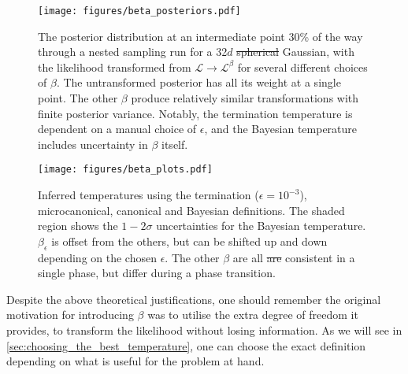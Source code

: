 \documentclass[usenatbib]{mnras}
\newcommand{\Like}{\mathcal{L}}
\providecommand{\DIFaddtex}[1]{{\protect\color{blue}\uwave{#1}}} %
\providecommand{\DIFdeltex}[1]{{\protect\color{red}\sout{#1}}}                      %
\providecommand{\DIFaddFL}[1]{\DIFadd{#1}} %
\providecommand{\DIFdelFL}[1]{\DIFdel{#1}} %
\providecommand{\DIFaddbeginFL}{} %
\providecommand{\DIFaddendFL}{} %
\providecommand{\DIFdelbeginFL}{} %
\providecommand{\DIFdelendFL}{} %
\providecommand{\DIFadd}[1]{\texorpdfstring{\DIFaddtex{#1}}{#1}} %
\providecommand{\DIFdel}[1]{\texorpdfstring{\DIFdeltex{#1}}{}} %
\newcommand{\DIFscaledelfig}{0.5}
\newlength{\DIFdelgraphicswidth} %
\newlength{\DIFdelgraphicsheight} %
\newcommand{\DIFaddincludegraphics}[2][]{{\color{blue}\fbox{\DIFOincludegraphics[#1]{#2}}}} %
\newcommand{\DIFdelincludegraphics}[2][]{%
\sbox{\DIFdelgraphicsbox}{\DIFOincludegraphics[#1]{#2}}%
\settoboxwidth{\DIFdelgraphicswidth}{\DIFdelgraphicsbox} %
\settoboxtotalheight{\DIFdelgraphicsheight}{\DIFdelgraphicsbox} %
\scalebox{\DIFscaledelfig}{%
\parbox[b]{\DIFdelgraphicswidth}{\usebox{\DIFdelgraphicsbox}\\[-\baselineskip] \rule{\DIFdelgraphicswidth}{0em}}\llap{\resizebox{\DIFdelgraphicswidth}{\DIFdelgraphicsheight}{%
\setlength{\unitlength}{\DIFdelgraphicswidth}%
\begin{picture}(1,1)%
\thicklines\linethickness{2pt} %
{\color[rgb]{1,0,0}\put(0,0){\framebox(1,1){}}}%
{\color[rgb]{1,0,0}\put(0,0){\line( 1,1){1}}}%
{\color[rgb]{1,0,0}\put(0,1){\line(1,-1){1}}}%
\end{picture}%
}\hspace*{3pt}}} %
} %
\DeclareRobustCommand{\DIFaddbeginFL}{\DIFOaddbeginFL \let\includegraphics\DIFaddincludegraphics} %
\DeclareRobustCommand{\DIFaddendFL}{\DIFOaddendFL \let\includegraphics\DIFOincludegraphics} %
\DeclareRobustCommand{\DIFdelbeginFL}{\DIFOdelbeginFL \let\includegraphics\DIFdelincludegraphics} %
\DeclareRobustCommand{\DIFdelendFL}{\DIFOaddendFL \let\includegraphics\DIFOincludegraphics} %
\begin{document}
\begin{figure*}
\begin{center}
    \texttt{[image: figures/beta\_posteriors.pdf]}
\end{center}
\caption{The posterior distribution at an intermediate point 30\% of the way through a nested sampling run for a 32$d$ \DIFdelbeginFL \DIFdelFL{spherical }\DIFdelendFL \DIFaddbeginFL \DIFaddFL{isotropic }\DIFaddendFL Gaussian, with the likelihood transformed from  $\Like \to \Like^{\beta}$ for several different choices of $\beta$. The untransformed posterior has all its weight at a single point. The other $\beta$ produce relatively similar transformations with finite posterior variance. Notably, the termination temperature is dependent on a manual choice of $\epsilon$, and the Bayesian temperature includes uncertainty in $\beta$ itself.}
\label{fig:beta_posteriors}
\end{figure*}

\begin{figure}
\begin{center}
    \texttt{[image: figures/beta\_plots.pdf]}
\end{center}
\caption{Inferred temperatures using the termination ($\epsilon = 10^{-3}$), microcanonical, canonical and Bayesian definitions. The shaded region shows the $1-2\sigma$ uncertainties for the Bayesian temperature. $\beta_\epsilon$ is offset from the others, but can be shifted up and down depending on the chosen $\epsilon$. The other $\beta$ are all \DIFdelbeginFL \DIFdelFL{are }\DIFdelendFL consistent in a single phase, but differ during a phase transition.}
\label{fig:beta_plots}
\end{figure}
Despite the above theoretical justifications, one should remember the original motivation for introducing $\beta$ was to utilise the extra degree of freedom it provides, to transform the likelihood without losing information. As we will see in \cref{sec:choosing_the_best_temperature}, one can choose the exact definition depending on what is useful for the problem at hand.
\end{document}
